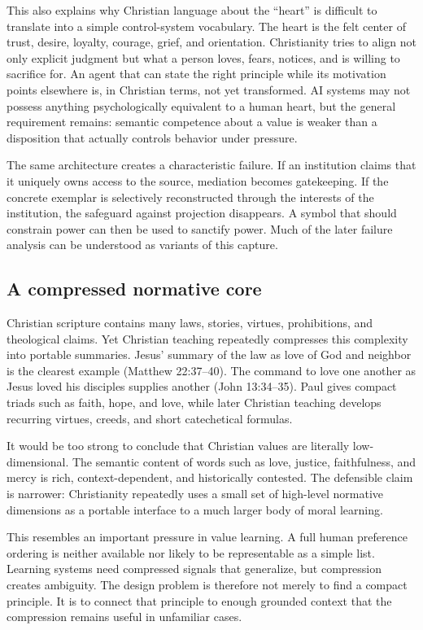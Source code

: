 \documentclass[11pt]{article}
\begin{document}
This also explains why Christian language about the ``heart'' is difficult to translate into a simple control-system vocabulary. The heart is the felt center of trust, desire, loyalty, courage, grief, and orientation. Christianity tries to align not only explicit judgment but what a person loves, fears, notices, and is willing to sacrifice for. An agent that can state the right principle while its motivation points elsewhere is, in Christian terms, not yet transformed. AI systems may not possess anything psychologically equivalent to a human heart, but the general requirement remains: semantic competence about a value is weaker than a disposition that actually controls behavior under pressure.

The same architecture creates a characteristic failure. If an institution claims that it uniquely owns access to the source, mediation becomes gatekeeping. If the concrete exemplar is selectively reconstructed through the interests of the institution, the safeguard against projection disappears. A symbol that should constrain power can then be used to sanctify power. Much of the later failure analysis can be understood as variants of this capture.

\subsection{A compressed normative core}

Christian scripture contains many laws, stories, virtues, prohibitions, and theological claims. Yet Christian teaching repeatedly compresses this complexity into portable summaries. Jesus' summary of the law as love of God and neighbor is the clearest example (Matthew 22:37--40). The command to love one another as Jesus loved his disciples supplies another (John 13:34--35). Paul gives compact triads such as faith, hope, and love, while later Christian teaching develops recurring virtues, creeds, and short catechetical formulas.

It would be too strong to conclude that Christian values are literally low-dimensional. The semantic content of words such as love, justice, faithfulness, and mercy is rich, context-dependent, and historically contested. The defensible claim is narrower: Christianity repeatedly uses a small set of high-level normative dimensions as a portable interface to a much larger body of moral learning.

This resembles an important pressure in value learning. A full human preference ordering is neither available nor likely to be representable as a simple list. Learning systems need compressed signals that generalize, but compression creates ambiguity. The design problem is therefore not merely to find a compact principle. It is to connect that principle to enough grounded context that the compression remains useful in unfamiliar cases.
\end{document}
